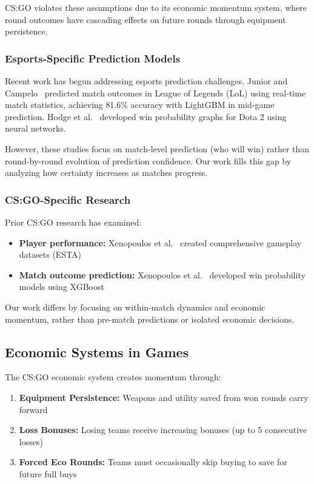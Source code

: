 \documentclass[11pt]{article}
\begin{document}
CS:GO violates these assumptions due to its economic momentum system, where round outcomes have cascading effects on future rounds through equipment persistence.

\subsubsection{Esports-Specific Prediction Models}

Recent work has begun addressing esports prediction challenges. Junior and Campelo~\cite{junior2023} predicted match outcomes in League of Legends (LoL) using real-time match statistics, achieving 81.6\% accuracy with LightGBM in mid-game prediction. Hodge et al.~\cite{hodge2019} developed win probability graphs for Dota 2 using neural networks.

However, these studies focus on match-level prediction (who will win) rather than round-by-round evolution of prediction confidence. Our work fills this gap by analyzing how certainty increases as matches progress.

\subsubsection{CS:GO-Specific Research}

Prior CS:GO research has examined:
\begin{itemize}
    \item \textbf{Player performance:} Xenopoulos et al.~\cite{xenopoulos2020} created comprehensive gameplay datasets (ESTA)
    \item \textbf{Match outcome prediction:} Xenopoulos et al.~\cite{xenopoulos2021} developed win probability models using XGBoost
\end{itemize}

Our work differs by focusing on within-match dynamics and economic momentum, rather than pre-match predictions or isolated economic decisions.

\subsection{Economic Systems in Games}

The CS:GO economic system creates momentum through:
\begin{enumerate}
    \item \textbf{Equipment Persistence:} Weapons and utility saved from won rounds carry forward
    \item \textbf{Loss Bonuses:} Losing teams receive increasing bonuses (up to 5 consecutive losses)
    \item \textbf{Forced Eco Rounds:} Teams must occasionally skip buying to save for future full buys
\end{enumerate}
\end{document}
